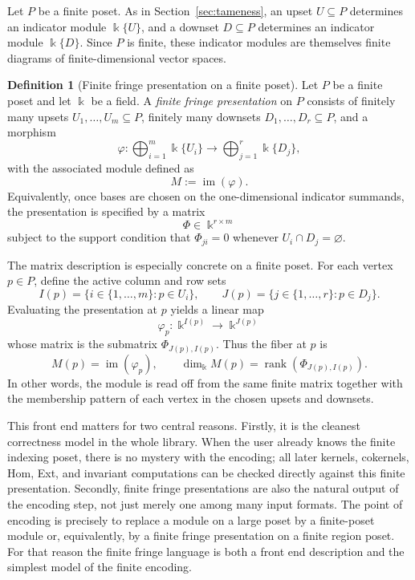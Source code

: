 \documentclass[11pt]{article}
\newcommand{\kk}{\Bbbk}
\theoremstyle{definition}
\newtheorem{defn}[theorem]{Definition}
\theoremstyle{remark}
\begin{document}
Let \(P\) be a finite poset.  As in Section~\ref{sec:tameness}, an upset \(U \subseteq P\) determines an indicator module \(\kk\{U\}\), and a downset \(D \subseteq P\) determines an indicator module \(\kk\{D\}\).  Since \(P\) is finite, these indicator modules are themselves finite diagrams of finite-dimensional vector spaces.

\begin{defn}[Finite fringe presentation on a finite poset]
	Let \(P\) be a finite poset and let \(\kk\) be a field.  A \emph{finite fringe presentation} on \(P\) consists of finitely many upsets \(U_1,\dots,U_m\subseteq P\), finitely many downsets \(D_1,\dots,D_r\subseteq P\), and a morphism
	\[
	\varphi : \bigoplus_{i=1}^m \kk\{U_i\}\longrightarrow \bigoplus_{j=1}^r \kk\{D_j\},
	\]
	with the associated module defined as
	\[
	M:=\operatorname{im}(\varphi).
	\]
	Equivalently, once bases are chosen on the one-dimensional indicator summands, the presentation is specified by a matrix
	\[
	\Phi\in \kk^{r\times m}
	\]
	subject to the support condition that \(\Phi_{ji}=0\) whenever \(U_i\cap D_j=\varnothing\).
\end{defn}

The matrix description is especially concrete on a finite poset.  For each vertex \(p\in P\), define the active column and row sets
\[
I(p)=\{i\in\{1,\dots,m\}:p\in U_i\},
\qquad
J(p)=\{j\in\{1,\dots,r\}:p\in D_j\}.
\]
Evaluating the presentation at \(p\) yields a linear map
\[
\varphi_p : \kk^{I(p)}\longrightarrow \kk^{J(p)}
\]
whose matrix is the submatrix \(\Phi_{J(p),I(p)}\).  Thus the fiber at \(p\) is
\[
M(p)=\operatorname{im}(\varphi_p),
\qquad
\dim_\kk M(p)=\operatorname{rank}(\Phi_{J(p),I(p)}).
\]
In other words, the module is read off from the same finite matrix together with the membership pattern of each vertex in the chosen upsets and downsets.

This front end matters for two central reasons.  Firstly, it is the cleanest correctness model in the whole library.  When the user already knows the finite indexing poset, there is no mystery with the encoding; all later kernels, cokernels, Hom, Ext, and invariant computations can be checked directly against this finite presentation.  Secondly, finite fringe presentations are also the natural output of the encoding step, not just merely one among many input formats.  The point of encoding is precisely to replace a module on a large poset by a finite-poset module or, equivalently, by a finite fringe presentation on a finite region poset.  For that reason the finite fringe language is both a front end description and the simplest model of the finite encoding.
\end{document}
